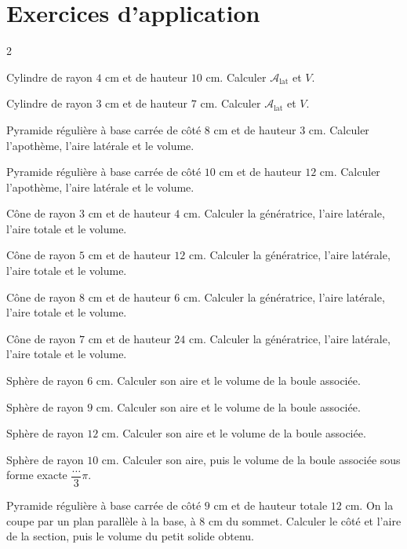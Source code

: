 \section{Exercices d'application}
\begin{multicols}{2}

\exo{} Cylindre de rayon $4$ cm et de hauteur $10$ cm. Calculer $\mathcal{A}_{\text{lat}}$
et $V$.

\exo{} Cylindre de rayon $3$ cm et de hauteur $7$ cm. Calculer $\mathcal{A}_{\text{lat}}$
et $V$.

\exo{} Pyramide régulière à base carrée de côté $8$ cm et de hauteur $3$ cm.
Calculer l'apothème, l'aire latérale et le volume.

\exo{} Pyramide régulière à base carrée de côté $10$ cm et de hauteur $12$ cm.
Calculer l'apothème, l'aire latérale et le volume.

\exo{} Cône de rayon $3$ cm et de hauteur $4$ cm. Calculer la génératrice, l'aire
latérale, l'aire totale et le volume.

\exo{} Cône de rayon $5$ cm et de hauteur $12$ cm. Calculer la génératrice, l'aire
latérale, l'aire totale et le volume.

\exo{} Cône de rayon $8$ cm et de hauteur $6$ cm. Calculer la génératrice, l'aire
latérale, l'aire totale et le volume.

\exo{} Cône de rayon $7$ cm et de hauteur $24$ cm. Calculer la génératrice, l'aire
latérale, l'aire totale et le volume.

\exo{} Sphère de rayon $6$ cm. Calculer son aire et le volume de la boule associée.

\exo{} Sphère de rayon $9$ cm. Calculer son aire et le volume de la boule associée.

\exo{} Sphère de rayon $12$ cm. Calculer son aire et le volume de la boule associée.

\exo{} Sphère de rayon $10$ cm. Calculer son aire, puis le volume de la boule
associée sous forme exacte $\dfrac{\ldots}{3}\pi$.

\exo{} Pyramide régulière à base carrée de côté $9$ cm et de hauteur totale $12$ cm.
On la coupe par un plan parallèle à la base, à $8$ cm du sommet. Calculer le côté et l'aire
de la section, puis le volume du petit solide obtenu.


\end{multicols}
